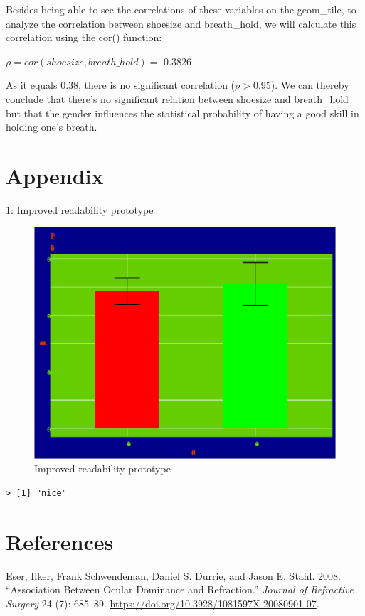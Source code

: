 \documentclass[]{article}
\begin{document}
Besides being able to see the correlations of these variables on the geom\_tile, to analyze the correlation between shoesize and breath\_hold, we will calculate this correlation using the cor() function:

\(\rho = cor(shoesize, breath\_hold)=\) 0.3826

As it equals 0.38, there is no significant correlation (\(\rho>0.95\)). We can thereby conclude that there's no significant relation between shoesize and breath\_hold but that the gender influences the statistical probability of having a good skill in holding one's breath.

\hypertarget{appendix}{%
\section{Appendix}\label{appendix}}

1: Improved readability prototype

\begin{figure}
\centering
\includegraphics{Personality-Data-Analysis-Portfolio-1_files/figure-latex/unnamed-chunk-17-1.pdf}
\caption{\label{fig:unnamed-chunk-17}Improved readability prototype}
\end{figure}

\begin{verbatim}
> [1] "nice"
\end{verbatim}

\hypertarget{references}{%
\section*{References}\label{references}}

\hypertarget{refs}{}
\leavevmode\hypertarget{ref-eser_association_2008}{}%
Eser, Ilker, Frank Schwendeman, Daniel S. Durrie, and Jason E. Stahl. 2008. ``Association Between Ocular Dominance and Refraction.'' \emph{Journal of Refractive Surgery} 24 (7): 685--89. \url{https://doi.org/10.3928/1081597X-20080901-07}.
\end{document}
